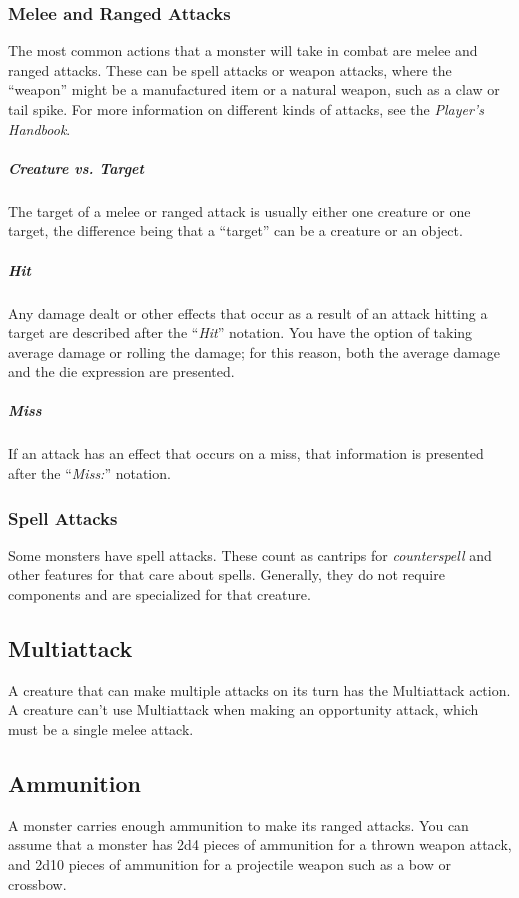 \subsubsection{Melee and Ranged Attacks}

The most common actions that a monster will take in combat are melee and ranged attacks. These can be spell attacks or weapon attacks, where the “weapon” might be a manufactured item or a natural weapon, such as a claw or tail spike. For more information on different kinds of attacks, see the \textit{Player's Handbook}.

\subparagraph*{Creature vs. Target} The target of a melee or ranged attack is usually either one creature or one target, the difference being that a “target” can be a creature or an object.

\subparagraph*{Hit} Any damage dealt or other effects that occur as a result of an attack hitting a target are described after the “\textit{Hit}” notation. You have the option of taking average damage or rolling the damage; for this reason, both the average damage and the die expression are presented.

\subparagraph*{Miss} If an attack has an effect that occurs on a miss, that information is presented after the “\textit{Miss:}” notation.

\subsubsection{Spell Attacks}

Some monsters have spell attacks. These count as cantrips for \textit{counterspell} and other features for that care about spells. Generally, they do not require components and are specialized for that creature. 

\subsection{Multiattack}

A creature that can make multiple attacks on its turn has the Multiattack action. A creature can't use Multiattack when making an opportunity attack, which must be a single melee attack.

\subsection{Ammunition}

A monster carries enough ammunition to make its ranged attacks. You can assume that a monster has 2d4 pieces of ammunition for a thrown weapon attack, and 2d10 pieces of ammunition for a projectile weapon such as a bow or crossbow.

